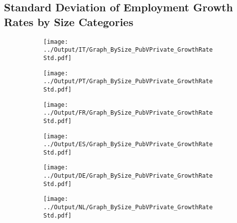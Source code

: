 \documentclass[12pt,notitlepage]{article}
\begin{document}
\subsection{Standard Deviation of Employment Growth Rates by Size Categories}
\begin{figure}[!htpb]
\centering
\begin{subfigure}{.49\textwidth}
    \centering
 \texttt{[image: ../Output/IT/Graph\_BySize\_PubVPrivate\_GrowthRateStd.pdf]}
\end{subfigure}%
\begin{subfigure}{.49\textwidth}
    \centering
 \texttt{[image: ../Output/PT/Graph\_BySize\_PubVPrivate\_GrowthRateStd.pdf]}
\end{subfigure}
\begin{subfigure}{.49\textwidth}
    \centering
 \texttt{[image: ../Output/FR/Graph\_BySize\_PubVPrivate\_GrowthRateStd.pdf]}
\end{subfigure}%
\begin{subfigure}{.49\textwidth}
    \centering
 \texttt{[image: ../Output/ES/Graph\_BySize\_PubVPrivate\_GrowthRateStd.pdf]}
\end{subfigure}
\begin{subfigure}{.49\textwidth}
    \centering
 \texttt{[image: ../Output/DE/Graph\_BySize\_PubVPrivate\_GrowthRateStd.pdf]}
\end{subfigure}
\begin{subfigure}{.49\textwidth}
    \centering
 \texttt{[image: ../Output/NL/Graph\_BySize\_PubVPrivate\_GrowthRateStd.pdf]}
\end{subfigure}
\end{figure}
\end{document}
